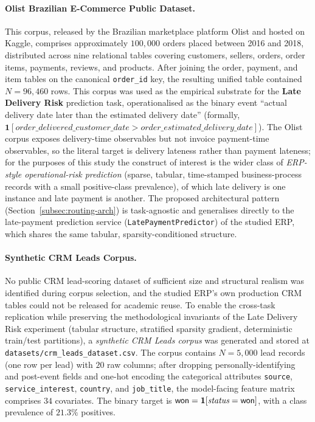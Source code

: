 \paragraph{Olist Brazilian E-Commerce Public Dataset.}
This corpus, released by the Brazilian marketplace platform Olist and hosted
on Kaggle, comprises approximately $100{,}000$ orders placed between 2016 and
2018, distributed across nine relational tables covering customers, sellers,
orders, order items, payments, reviews, and products. After joining the
order, payment, and item tables on the canonical \texttt{order\_id} key, the
resulting unified table contained $N = 96{,}460$ rows. This corpus was used
as the empirical substrate for the \textbf{Late Delivery Risk} prediction
task, operationalised as the binary event ``actual delivery date later than
the estimated delivery date'' (formally,
$\mathbf{1}[\textit{order\_delivered\_customer\_date} >
\textit{order\_estimated\_delivery\_date}]$). The Olist corpus exposes
delivery-time observables but not invoice payment-time observables, so the
literal target is delivery lateness rather than payment lateness; for the
purposes of this study the construct of interest is the wider class of
\emph{ERP-style operational-risk prediction} (sparse, tabular, time-stamped
business-process records with a small positive-class prevalence), of which
late delivery is one instance and late payment is another. The proposed
architectural pattern (Section~\ref{subsec:routing-arch}) is task-agnostic and
generalises directly to the late-payment prediction service
(\texttt{LatePaymentPredictor}) of the studied ERP, which shares the same
tabular, sparsity-conditioned structure.

\paragraph{Synthetic CRM Leads Corpus.}
\label{para:crm-leads-synth}
No public CRM lead-scoring dataset of sufficient size and structural realism
was identified during corpus selection, and the studied ERP's own production
CRM tables could not be released for academic reuse. To enable the
cross-task replication while preserving the methodological invariants of
the Late Delivery Risk experiment (tabular structure, stratified sparsity
gradient, deterministic train/test partitions), a \emph{synthetic CRM
Leads corpus} was generated and stored at
\texttt{datasets/crm\_leads\_dataset.csv}. The corpus contains $N = 5{,}000$
lead records (one row per lead) with $20$ raw columns; after dropping
personally-identifying and post-event fields and one-hot encoding the
categorical attributes \texttt{source}, \texttt{service\_interest},
\texttt{country}, and \texttt{job\_title}, the model-facing feature matrix
comprises $34$ covariates. The binary target is
$\textsf{won} = \mathbf{1}[\textit{status} = \text{\textsf{won}}]$, with a
class prevalence of $21.3\%$ positives.

